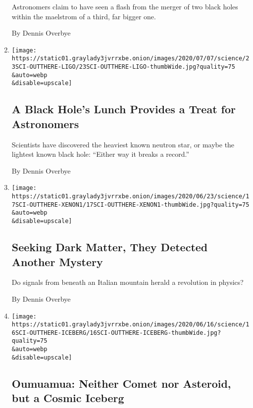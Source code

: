 \begin{enumerate}
  Astronomers claim to have seen a flash from the merger of two black
  holes within the maelstrom of a third, far bigger one.

  By Dennis Overbye
\item
  \href{/2020/06/24/science/black-hole-ligo-gravitational.html}{}

  \texttt{[image: https://static01.graylady3jvrrxbe.onion/images/2020/07/07/science/23SCI-OUTTHERE-LIGO/23SCI-OUTTHERE-LIGO-thumbWide.jpg?quality=75\\\&auto=webp\\\&disable=upscale]}

  \hypertarget{a-black-holes-lunch-provides-a-treat-for-astronomers}{%
  \subsection{A Black Hole's Lunch Provides a Treat for
  Astronomers}\label{a-black-holes-lunch-provides-a-treat-for-astronomers}}

  Scientists have discovered the heaviest known neutron star, or maybe
  the lightest known black hole: ``Either way it breaks a record.''

  By Dennis Overbye
\item
  \href{/2020/06/17/science/xenon-axions-neutrinos-tritium.html}{}

  \texttt{[image: https://static01.graylady3jvrrxbe.onion/images/2020/06/23/science/17SCI-OUTTHERE-XENON1/17SCI-OUTTHERE-XENON1-thumbWide.jpg?quality=75\\\&auto=webp\\\&disable=upscale]}

  \hypertarget{seeking-dark-matter-they-detected-another-mystery}{%
  \subsection{Seeking Dark Matter, They Detected Another
  Mystery}\label{seeking-dark-matter-they-detected-another-mystery}}

  Do signals from beneath an Italian mountain herald a revolution in
  physics?

  By Dennis Overbye
\item
  \href{/2020/06/15/science/oumuamua-astronomy-comets.html}{}

  \texttt{[image: https://static01.graylady3jvrrxbe.onion/images/2020/06/16/science/16SCI-OUTTHERE-ICEBERG/16SCI-OUTTHERE-ICEBERG-thumbWide.jpg?quality=75\\\&auto=webp\\\&disable=upscale]}

  \hypertarget{oumuamua-neither-comet-nor-asteroid-but-a-cosmic-iceberg}{%
  \subsection{Oumuamua: Neither Comet nor Asteroid, but a Cosmic
  Iceberg}\label{oumuamua-neither-comet-nor-asteroid-but-a-cosmic-iceberg}}


\end{enumerate}
